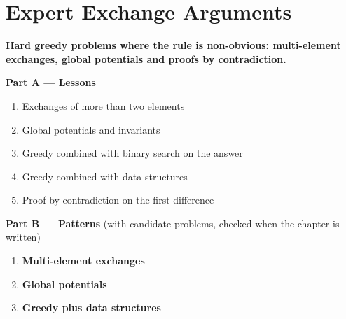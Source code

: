 \chapter{Expert Exchange Arguments}
\label{ch:expert_exchange}

\begin{tcolorbox}[enhanced, colback=white, colframe=secondaryblue, boxrule=1pt, arc=2mm]
\textbf{\large\textcolor{primaryblue}{Hard greedy problems where the rule is non-obvious: multi-element exchanges, global potentials and proofs by contradiction.}}
\end{tcolorbox}


\begin{plannedbox}
\textbf{Part A --- Lessons}
\begin{enumerate}[leftmargin=*, label=\textbf{A\arabic*.}, itemsep=1pt]
    \item Exchanges of more than two elements
    \item Global potentials and invariants
    \item Greedy combined with binary search on the answer
    \item Greedy combined with data structures
    \item Proof by contradiction on the first difference
\end{enumerate}
\textbf{Part B --- Patterns} (with candidate problems, checked when the chapter is written)
\begin{enumerate}[leftmargin=*, label=\textbf{P\arabic*.}, itemsep=1pt]
    \item \textbf{Multi-element exchanges}
    \item \textbf{Global potentials}
    \item \textbf{Greedy plus data structures}
\end{enumerate}
\end{plannedbox}
